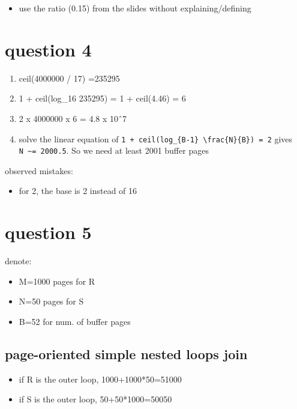 \documentclass{article}
\providecommand{\tightlist}{%
  \setlength{\itemsep}{0pt}\setlength{\parskip}{0pt}}
\begin{document}
\begin{itemize}
\tightlist
\item
  use the ratio (0.15) from the slides without explaining/defining
\end{itemize}

\section{question 4}\label{question-4}

\begin{enumerate}
\def\labelenumi{\arabic{enumi}.}
\tightlist
\item
  ceil(4000000 / 17) =235295
\item
  1 + ceil(log\_16 235295) = 1 + ceil(4.46) = 6
\item
  2 x 4000000 x 6 = 4.8 x 10ˆ7
\item
  solve the linear equation of
  \texttt{1\ +\ ceil(log\_\{B-1\}\ \textbackslash{}frac\{N\}\{B\})\ =\ 2}
  gives \texttt{N\ \textasciitilde{}=\ 2000.5}. So we need at least 2001
  buffer pages
\end{enumerate}

observed mistakes:

\begin{itemize}
\tightlist
\item
  for 2, the base is 2 instead of 16
\end{itemize}

\section{question 5}\label{question-5}

denote:

\begin{itemize}
\tightlist
\item
  M=1000 pages for R
\item
  N=50 pages for S
\item
  B=52 for num. of buffer pages
\end{itemize}

\subsection{page-oriented simple nested loops
join}\label{page-oriented-simple-nested-loops-join}

\begin{itemize}
\tightlist
\item
  if R is the outer loop, 1000+1000*50=51000
\item
  if S is the outer loop, 50+50*1000=50050
\end{itemize}
\end{document}
